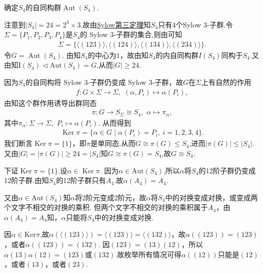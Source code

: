 \documentclass[../../main.tex]{subfiles}%
\begin{document}
\begin{example}
确定$S_4$的自同构群$\operatorname{Aut}(S_4)$.
\end{example}
\begin{solution}
注意到$|S_4|=24=2^3\times 3$,故由\hyperref[theorem:Sylow第三定理]{Sylow第三定理}知$S_4$只有4个Sylow 3-子群.令$\Sigma = \{P_1, P_2, P_3, P_4\}$是$S_4$的 Sylow 3-子群的集合,则由可知
\begin{align*}
\Sigma = \{\langle(123)\rangle, \langle(124)\rangle, \langle(134)\rangle, \langle(234)\rangle\}.
\end{align*}
令$G = \operatorname{Aut}(S_4)$. 由知$S_4$的中心为$1$，故由知$S_4$的内自同构群$I(S_4)$同构于$S_4$.又由知$\text{I}(S_4)\lhd \text{Aut}(S_4)=G$,从而$|G| \geqslant 24$.

因为$S_4$的自同构将 Sylow 3-子群仍变成 Sylow 3-子群，故$G$在$\Sigma$上有自然的作用
\begin{align*}
f:G\times \Sigma\to \Sigma ,\,\,(\alpha,P_i)\mapsto \alpha(P_i),
\end{align*}
由知这个群作用诱导出群同态
\begin{align*}
\pi: G \to S_\Sigma \cong S_4,\,\,\alpha\mapsto \pi_{\alpha},
\end{align*}
其中$\pi_\alpha:\Sigma \to \Sigma,\,\,P_i\mapsto \alpha(P_i)$.
从而得到
\begin{align*}
\operatorname{Ker}\pi = \{\alpha \in G \mid \alpha(P_i) = P_i,\ i = 1,2,3,4\}.
\end{align*}
我们断言$\operatorname{Ker}\pi = \{1\}$，即$\pi$是单同态.从而$G\cong \pi(G)\leqslant S_4$,进而$|\pi(G)|\leqslant |S_4|$.
又由$|G|=|\pi(G)| \geqslant 24=|S_4|$知$G\cong \pi(G) = S_4$,故$G \cong S_4$.

下证$\operatorname{Ker}\pi = \{1\}$.设$\alpha \in \operatorname{Ker}\pi$. 因为$\alpha\in \text{Aut}(S_4)$,所以$\alpha$将$S_4$的12阶子群仍变成12阶子群.由知$S_4$的12阶子群只有$A_4$.故$\alpha(A_4) = A_4$.

又由$\alpha\in \text{Aut}(S_4)$知$\alpha$将2阶元变成2阶元，故$\alpha$将$S_4$中的对换变成对换，或变成两个文字不相交的对换的乘积. 但两个文字不相交的对换的乘积属于$A_4$，由$\alpha(A_4) = A_4$知，$\alpha$只能将$S_4$中的对换变成对换.

因$\alpha\in \text{Ker}\pi$,故$\alpha(\langle(123)\rangle) = \langle(123)\rangle=\langle(132)\rangle$，故$\alpha((123)) = (123)$，或者$\alpha((123)) = (132)$. 因$(123) = (13)(12)$，所以$\alpha(13)\alpha(12)=(123)$或$(132)$.故枚举所有情况可得$\alpha((12))$只能是$(12)$，或者$(13)$，或者$(23)$.


\end{solution}
\end{document}

